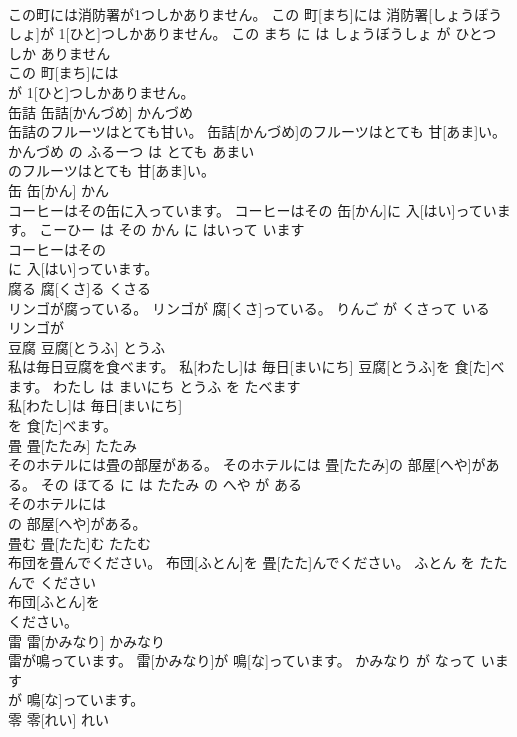 \documentclass[8pt]{extreport}
\begin{document}
\begin{CJK}{UTF8}{min}
\\	この町には消防署が1つしかありません。	この 町[まち]には 消防署[しょうぼうしょ]が 1[ひと]つしかありません。	この まち に は しょうぼうしょ が ひとつ しか ありません	
\\	この 町[まち]には
\\	が 1[ひと]つしかありません。			
\\	缶詰	缶詰[かんづめ]	かんづめ	
\\	缶詰のフルーツはとても甘い。	缶詰[かんづめ]のフルーツはとても 甘[あま]い。	かんづめ の ふるーつ は とても あまい	
\\	のフルーツはとても 甘[あま]い。			
\\	缶	缶[かん]	かん	
\\	コーヒーはその缶に入っています。	コーヒーはその 缶[かん]に 入[はい]っています。	こーひー は その かん に はいって います	
\\	コーヒーはその
\\	に 入[はい]っています。			
\\	腐る	腐[くさ]る	くさる	
\\	リンゴが腐っている。	リンゴが 腐[くさ]っている。	りんご が くさって いる	
\\	リンゴが
\\	豆腐	豆腐[とうふ]	とうふ	
\\	私は毎日豆腐を食べます。	私[わたし]は 毎日[まいにち] 豆腐[とうふ]を 食[た]べます。	わたし は まいにち とうふ を たべます	
\\	私[わたし]は 毎日[まいにち]
\\	を 食[た]べます。			
\\	畳	畳[たたみ]	たたみ	
\\	そのホテルには畳の部屋がある。	そのホテルには 畳[たたみ]の 部屋[へや]がある。	その ほてる に は たたみ の へや が ある	
\\	そのホテルには
\\	の 部屋[へや]がある。			
\\	畳む	畳[たた]む	たたむ	
\\	布団を畳んでください。	布団[ふとん]を 畳[たた]んでください。	ふとん を たたんで ください	
\\	布団[ふとん]を
\\	ください。			
\\	雷	雷[かみなり]	かみなり	
\\	雷が鳴っています。	雷[かみなり]が 鳴[な]っています。	かみなり が なって います	
\\	が 鳴[な]っています。			
\\	零	零[れい]	れい	

\end{CJK}
\end{document}
